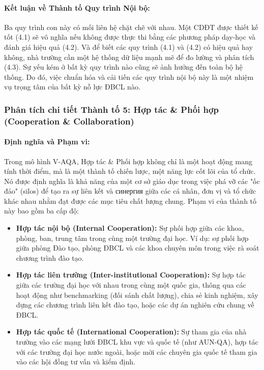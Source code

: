 \documentclass[12pt, a4paper, openany]{report}
\begin{document}
\paragraph{Kết luận về Thành tố Quy trình Nội bộ:}
Ba quy trình con này có mối liên hệ chặt chẽ với nhau. Một CDĐT được thiết kế tốt (4.1) sẽ vô nghĩa nếu không được thực thi bằng các phương pháp dạy-học và đánh giá hiệu quả (4.2). Và để biết các quy trình (4.1) và (4.2) có hiệu quả hay không, nhà trường cần một hệ thống dữ liệu mạnh mẽ để đo lường và phân tích (4.3). Sự yếu kém ở bất kỳ quy trình nào cũng sẽ ảnh hưởng đến toàn bộ hệ thống. Do đó, việc chuẩn hóa và cải tiến các quy trình nội bộ này là một nhiệm vụ trọng tâm của bất kỳ nỗ lực ĐBCL nào.



\subsubsection{Phân tích chi tiết Thành tố 5: Hợp tác \& Phối hợp (Cooperation \& Collaboration)}
\label{subsubsec:thanh_to_5}

\paragraph{Định nghĩa và Phạm vi:}
Trong mô hình V-AQA, Hợp tác \& Phối hợp không chỉ là một hoạt động mang tính thời điểm, mà là một thành tố chiến lược, một năng lực cốt lõi của tổ chức. Nó được định nghĩa là khả năng của một cơ sở giáo dục trong việc phá vỡ các "ốc đảo" (silos) để tạo ra sự liên kết và синергия giữa các cá nhân, đơn vị và tổ chức khác nhau nhằm đạt được các mục tiêu chất lượng chung. Phạm vi của thành tố này bao gồm ba cấp độ:
\begin{itemize}
    \item \textbf{Hợp tác nội bộ (Internal Cooperation):} Sự phối hợp giữa các khoa, phòng, ban, trung tâm trong cùng một trường đại học. Ví dụ: sự phối hợp giữa phòng Đào tạo, phòng ĐBCL và các khoa chuyên môn trong việc rà soát chương trình đào tạo.
    \item \textbf{Hợp tác liên trường (Inter-institutional Cooperation):} Sự hợp tác giữa các trường đại học với nhau trong cùng một quốc gia, thông qua các hoạt động như benchmarking (đối sánh chất lượng), chia sẻ kinh nghiệm, xây dựng các chương trình liên kết đào tạo, hoặc các dự án nghiên cứu chung về ĐBCL.
    \item \textbf{Hợp tác quốc tế (International Cooperation):} Sự tham gia của nhà trường vào các mạng lưới ĐBCL khu vực và quốc tế (như AUN-QA), hợp tác với các trường đại học nước ngoài, hoặc mời các chuyên gia quốc tế tham gia vào các hội đồng tư vấn và kiểm định.
\end{itemize}
\end{document}
